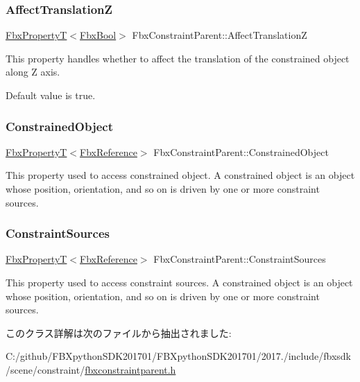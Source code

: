 \subsubsection{\texorpdfstring{Affect\+TranslationZ}{AffectTranslationZ}}
{\footnotesize\ttfamily \hyperlink{class_fbx_property_t}{Fbx\+PropertyT}$<$\hyperlink{fbxtypes_8h_a92e0562b2fe33e76a242f498b362262e}{Fbx\+Bool}$>$ Fbx\+Constraint\+Parent\+::\+Affect\+TranslationZ}

This property handles whether to affect the translation of the constrained object along Z axis.

Default value is true. \mbox{\label{class_fbx_constraint_parent_aaaf70448aed2fafcd4f2d7e1a4409a6e}} 
\subsubsection{\texorpdfstring{Constrained\+Object}{ConstrainedObject}}
{\footnotesize\ttfamily \hyperlink{class_fbx_property_t}{Fbx\+PropertyT}$<$\hyperlink{fbxtypes_8h_a44df6a2eec915cf27cd481e5c5e48a24}{Fbx\+Reference}$>$ Fbx\+Constraint\+Parent\+::\+Constrained\+Object}

This property used to access constrained object. A constrained object is an object whose position, orientation, and so on is driven by one or more constraint sources. \mbox{\label{class_fbx_constraint_parent_a02690debabacd0fe4b643cbb04c042a7}} 
\subsubsection{\texorpdfstring{Constraint\+Sources}{ConstraintSources}}
{\footnotesize\ttfamily \hyperlink{class_fbx_property_t}{Fbx\+PropertyT}$<$\hyperlink{fbxtypes_8h_a44df6a2eec915cf27cd481e5c5e48a24}{Fbx\+Reference}$>$ Fbx\+Constraint\+Parent\+::\+Constraint\+Sources}

This property used to access constraint sources. A constrained object is an object whose position, orientation, and so on is driven by one or more constraint sources. 

このクラス詳解は次のファイルから抽出されました\+:\begin{DoxyCompactItemize}
\item 
C\+:/github/\+F\+B\+Xpython\+S\+D\+K201701/\+F\+B\+Xpython\+S\+D\+K201701/2017./include/fbxsdk/scene/constraint/\hyperlink{fbxconstraintparent_8h}{fbxconstraintparent.\+h}\end{DoxyCompactItemize}
